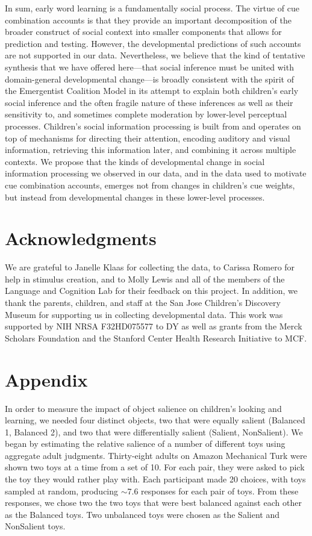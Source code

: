 \documentclass[man,floatsintext]{apa6}
\begin{document}
In sum, early word learning is a fundamentally social process. The virtue of cue combination accounts is that they provide an important decomposition of the broader construct of social context into smaller components that allows for prediction and testing. However, the developmental predictions of such accounts are not supported in our data. Nevertheless, we believe that the kind of tentative synthesis that we have offered here---that social inference must be united with domain-general developmental change---is broadly consistent with the spirit of the Emergentist Coalition Model in its attempt to explain both children's early social inference and the often fragile nature of these inferences as well as their sensitivity to, and sometimes complete moderation by lower-level perceptual processes. Children's social information processing is built from and operates on top of mechanisms for directing their attention, encoding auditory and visual information, retrieving this information later, and combining it across multiple contexts. We propose that the kinds of developmental change in social information processing we observed in our data, and in the data used to motivate cue combination accounts, emerges not from changes in children's cue weights, but instead from developmental changes in these lower-level processes.


\section{Acknowledgments}

We are grateful to Janelle Klaas for collecting the data, to Carissa Romero for help in stimulus creation, and to Molly Lewis and all of the members of the Language and Cognition Lab for their feedback on this project. In addition, we thank the parents, children, and staff at the San Jose Children's Discovery Museum for supporting us in collecting developmental data. This work was supported by NIH NRSA F32HD075577 to DY as well as grants from the Merck Scholars Foundation and the Stanford Center Health Research Initiative to MCF.

\section{Appendix}
\renewcommand\thefigure{A\arabic{figure}}   
\setcounter{figure}{0}    

In order to measure the impact of object salience on children's looking and learning, we needed four distinct objects, two that were equally salient (Balanced 1, Balanced 2), and two that were differentially salient (Salient, NonSalient). We began by estimating the relative salience of a number of different toys using aggregate adult judgments. Thirty-eight adults on Amazon Mechanical Turk were shown two toys at a time from a set of 10. For each pair, they were asked to pick the toy they would rather play with. Each participant made 20 choices, with toys sampled at random, producing $\sim$7.6 responses for each pair of toys. From these responses, we chose two  the two toys that were best balanced against each other as the Balanced toys. Two unbalanced toys were chosen as the Salient and NonSalient toys.
\end{document}
